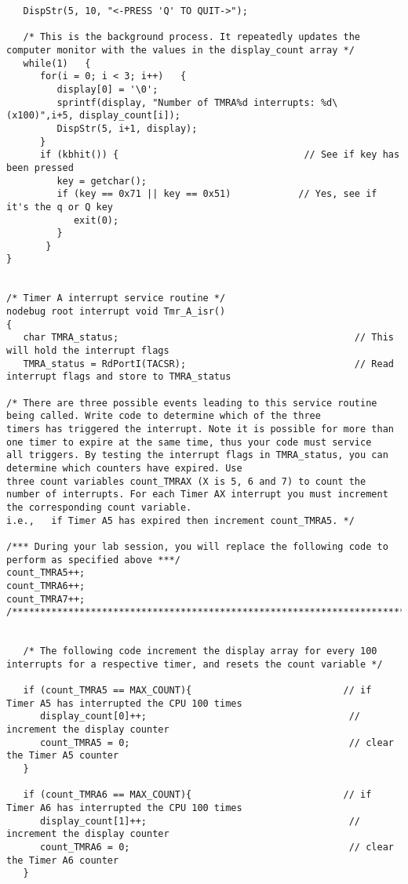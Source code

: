 \begin{lstlisting}
   DispStr(5, 10, "<-PRESS 'Q' TO QUIT->");

   /* This is the background process. It repeatedly updates the computer monitor with the values in the display_count array */
   while(1)   {
      for(i = 0; i < 3; i++)   {
         display[0] = '\0';
         sprintf(display, "Number of TMRA%d interrupts: %d\  (x100)",i+5, display_count[i]);
         DispStr(5, i+1, display);
      }
      if (kbhit()) {                                 // See if key has been pressed
         key = getchar();
         if (key == 0x71 || key == 0x51)            // Yes, see if it's the q or Q key
            exit(0);
         }
       }
}


/* Timer A interrupt service routine */
nodebug root interrupt void Tmr_A_isr()
{
   char TMRA_status;                                          // This will hold the interrupt flags
   TMRA_status = RdPortI(TACSR);                              // Read interrupt flags and store to TMRA_status

/* There are three possible events leading to this service routine being called. Write code to determine which of the three
timers has triggered the interrupt. Note it is possible for more than one timer to expire at the same time, thus your code must service
all triggers. By testing the interrupt flags in TMRA_status, you can determine which counters have expired. Use
three count variables count_TMRAX (X is 5, 6 and 7) to count the number of interrupts. For each Timer AX interrupt you must increment the corresponding count variable.
i.e.,   if Timer A5 has expired then increment count_TMRA5. */

/*** During your lab session, you will replace the following code to perform as specified above ***/
count_TMRA5++;
count_TMRA6++;
count_TMRA7++;
/**************************************************************************************************/


   /* The following code increment the display array for every 100 interrupts for a respective timer, and resets the count variable */

   if (count_TMRA5 == MAX_COUNT){                           // if Timer A5 has interrupted the CPU 100 times
      display_count[0]++;                                    // increment the display counter
      count_TMRA5 = 0;                                       // clear the Timer A5 counter
   }

   if (count_TMRA6 == MAX_COUNT){                           // if Timer A6 has interrupted the CPU 100 times
      display_count[1]++;                                    // increment the display counter
      count_TMRA6 = 0;                                       // clear the Timer A6 counter
   }


\end{lstlisting}
